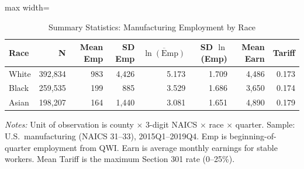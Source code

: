 \begin{table}[H]
\centering
\caption{Summary Statistics: Manufacturing Employment by Race}
\label{tab:summary}
\begin{threeparttable}
\begin{adjustbox}{max width=\textwidth}
\begin{tabular}{lrrrrrrr}
\toprule
Race & N & Mean Emp & SD Emp & $\overline{\ln(\text{Emp})}$ & SD $\ln$(Emp) & Mean Earn & Tariff \\
\midrule
White & 392,834 & 983 & 4,426 & 5.173 & 1.709 & 4,486 & 0.173 \\
Black & 259,535 & 199 & 885 & 3.529 & 1.686 & 3,650 & 0.174 \\
Asian & 198,207 & 164 & 1,440 & 3.081 & 1.651 & 4,890 & 0.179 \\
\bottomrule
\end{tabular}
\end{adjustbox}
\begin{tablenotes}[flushleft]
\footnotesize
\item \textit{Notes:} Unit of observation is county $\times$ 3-digit NAICS $\times$ race $\times$ quarter. Sample: U.S.\ manufacturing (NAICS 31--33), 2015Q1--2019Q4. Emp is beginning-of-quarter employment from QWI. Earn is average monthly earnings for stable workers. Mean Tariff is the maximum Section 301 rate (0--25\%).
\end{tablenotes}
\end{threeparttable}
\end{table}

